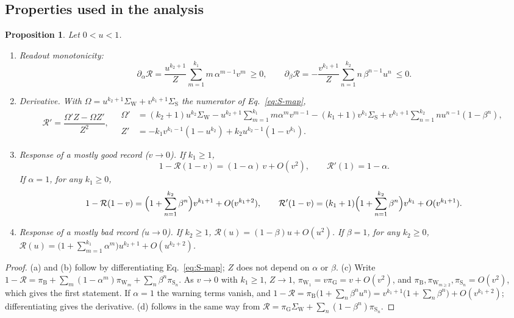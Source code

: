 \documentclass[fleqn,10pt]{article}
\theoremstyle{plain}
\newtheorem{proposition}{Proposition}
\theoremstyle{remark}
\newcommand{\Rm}{\mathcal R}
\newcommand{\G}{\mathrm G}
\newcommand{\B}{\mathrm B}
\newcommand{\W}{\mathrm W}
\renewcommand{\S}{\mathrm S}
\begin{document}
\subsection{Properties used in the analysis}
\begin{proposition}\label{prop:properties}
Let $0<u<1$.
\begin{enumerate}
\item[(a)] Readout monotonicity:
\begin{equation}
\partial_\alpha\Rm=\frac{u^{k_2+1}}{Z}\sum_{m=1}^{k_1}m\,\alpha^{m-1}v^m\ \ge0,
\qquad
\partial_\beta\Rm=-\frac{v^{k_1+1}}{Z}\sum_{n=1}^{k_2}n\,\beta^{n-1}u^n\ \le0 .
\label{eq:S-readout-derivatives}
\end{equation}
\item[(b)] Derivative. With $\Omega=u^{k_2+1}\Sigma_\W+v^{k_1+1}\Sigma_\S$ the numerator of Eq.~\eqref{eq:S-map},
\begin{equation}
\Rm'=\frac{\Omega'Z-\Omega Z'}{Z^2},\quad
\begin{aligned}
\Omega'&=(k_2+1)u^{k_2}\Sigma_\W-u^{k_2+1}\textstyle\sum_{m=1}^{k_1}m\alpha^mv^{m-1}
-(k_1+1)v^{k_1}\Sigma_\S+v^{k_1+1}\textstyle\sum_{n=1}^{k_2}nu^{n-1}(1-\beta^n),\\
Z'&=-k_1v^{k_1-1}(1-u^{k_2})+k_2u^{k_2-1}(1-v^{k_1}).
\end{aligned}
\label{eq:S-derivative}
\end{equation}
\item[(c)] Response of a mostly good record ($v\to0$). If $k_1\ge1$,
\begin{equation}
1-\Rm(1-v)=(1-\alpha)\,v+O(v^2),\qquad \Rm'(1)=1-\alpha .
\label{eq:S-near-one}
\end{equation}
If $\alpha=1$, for any $k_1\ge0$,
\begin{equation}
1-\Rm(1-v)=\Bigl(1+\sum_{n=1}^{k_2}\beta^n\Bigr)v^{k_1+1}+O(v^{k_1+2}),
\qquad
\Rm'(1-v)=(k_1+1)\Bigl(1+\sum_{n=1}^{k_2}\beta^n\Bigr)v^{k_1}+O(v^{k_1+1}).
\label{eq:S-near-one-full}
\end{equation}
\item[(d)] Response of a mostly bad record ($u\to0$). If $k_2\ge1$,
$\Rm(u)=(1-\beta)u+O(u^2)$. If $\beta=1$, for any $k_2\ge0$,
$\Rm(u)=\bigl(1+\sum_{m=1}^{k_1}\alpha^m\bigr)u^{k_2+1}+O(u^{k_2+2})$.
\end{enumerate}
\end{proposition}
\begin{proof}
(a) and (b) follow by differentiating Eq.~\eqref{eq:S-map}; $Z$ does not depend
on $\alpha$ or $\beta$. (c) Write
$1-\Rm=\pi_\B+\sum_m(1-\alpha^m)\pi_{\W_m}+\sum_n\beta^n\pi_{\S_n}$. As $v\to0$
with $k_1\ge1$, $Z\to1$, $\pi_{\W_1}=v\pi_\G=v+O(v^2)$, and
$\pi_\B,\pi_{\W_{m\ge2}},\pi_{\S_n}=O(v^2)$, which gives the first statement.
If $\alpha=1$ the warning terms vanish, and
$1-\Rm=\pi_\B\bigl(1+\sum_n\beta^nu^n\bigr)=v^{k_1+1}\bigl(1+\sum_n\beta^n\bigr)+O(v^{k_1+2})$;
differentiating gives the derivative. (d) follows in the same way from
$\Rm=\pi_\G\Sigma_\W+\sum_n(1-\beta^n)\pi_{\S_n}$.
\end{proof}
\end{document}
